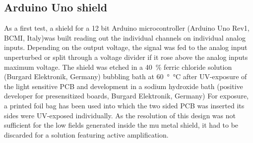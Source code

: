         \subsection{Arduino Uno shield}
        As a first test, a shield for a 12 bit Arduino microcontroller (Arduino Uno Rev1, BCMI, Italy)was built reading out the individual channels on individual analog inputs.  Depending on the output voltage, the signal was fed to the analog input unperturbed or split through a voltage divider if it rose above the analog inputs maximum voltage.  The shield was etched in a \SI{40}{\percent} ferric chloride solution (Burgard Elektronik, Germany) bubbling bath at \SI{60}{\degree\celsius} after UV-exposure of the light sensitive PCB and development in a sodium hydroxide bath (positive developer for presensitized boards, Burgard Elektronik, Germany)  For exposure, a printed foil bag has been used into which the two sided PCB was inserted  its sides were UV-exposed individually.  As the resolution of this design was not sufficient for the low fields generated inside the mu metal shield, it had to be discarded for a solution featuring active amplification.

